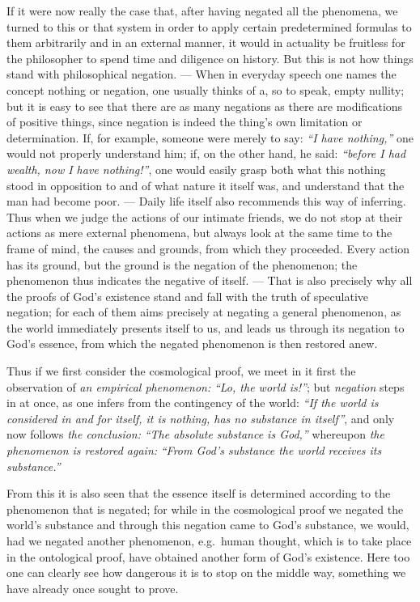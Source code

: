 \documentclass[12pt]{book}
\newcommand{\opage}[1]{\marginnote{\footnotesize\textit{[#1]}}}
\begin{document}
If it were now really the case that, after having negated all the phenomena, we
turned to this or that system in order to apply certain predetermined formulas
to them arbitrarily and in an external manner, it would in actuality be
fruitless for the philosopher to spend time and diligence on history. But this
is not how things stand with philosophical negation.
--- When in everyday speech one names the concept nothing or negation, one
usually thinks of a, so to speak, empty nullity; but it is easy to see that
there are as many negations as there are modifications of positive things,
since negation is indeed the thing's own limitation or determination. If, for
example, someone were merely to say:
\opage{21} \emph{``I have nothing,''} one would not properly understand him; if, on the
other hand, he said: \emph{``before I had wealth, now I have nothing!''}, one
would easily grasp both what this nothing stood in opposition to and of what
nature it itself was, and understand that the man had become poor. --- Daily
life itself also recommends this way of inferring. Thus when we judge the
actions of our intimate friends, we do not stop at their actions as mere
external phenomena, but always look at the same time to the frame of mind, the
causes and grounds, from which they proceeded. Every action has its ground, but
the ground is the negation of the phenomenon; the phenomenon thus indicates the
negative of itself. --- That is also precisely why all the proofs of God's
existence stand and fall with the truth of speculative negation; for each of
them aims precisely at negating a general phenomenon, as the world immediately
presents itself to us, and leads us through its negation to God's essence, from
which the negated phenomenon is then restored anew.

Thus if we first consider the cosmological proof, we meet in it first the
observation of \emph{an empirical phenomenon:} \emph{``Lo, the world is!''}; but
\emph{negation} steps in at once, as one infers from the contingency of the
world: \emph{``If the world is considered in and for itself, it is nothing, has
no substance in itself''}, and only now follows \emph{the conclusion:}
\emph{``The absolute substance is God,''} whereupon \emph{the phenomenon is
restored again:} \emph{``From God's substance the world receives its
substance.''}

From this it is also seen that the essence itself is determined according to the
phenomenon that is negated; for while in the cosmological proof we negated the
world's substance and through this negation came to God's substance, we would,
had we negated another phenomenon, e.g.\ human thought, which
\opage{22} is to take place in the ontological proof, have obtained another form of God's
existence. Here too one can clearly see how dangerous it is to stop on the
middle way, something we have already once sought to prove.
\end{document}
